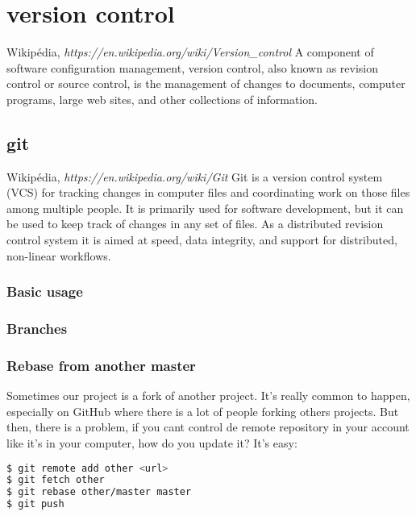 \chapter{version control}
\begin{chapquote}{Wikipédia, \textit{https://en.wikipedia.org/wiki/Version\_control}}
A component of software configuration management, version control, also known as revision control or source control, is the management of changes to documents, computer programs, large web sites, and other collections of information.
\end{chapquote}
\section{git}
\begin{chapquote}{Wikipédia, \textit{https://en.wikipedia.org/wiki/Git}}
Git is a version control system (VCS) for tracking changes in computer files and coordinating work on those files among multiple people. It is primarily used for software development, but it can be used to keep track of changes in any set of files. As a distributed revision control system it is aimed at speed, data integrity, and support for distributed, non-linear workflows.
\end{chapquote}
\subsection{Basic usage}

\subsection{Branches}

\subsection{Rebase from another master}
Sometimes our project is a fork of another project. It's really common to happen, especially on GitHub where there is a lot of people forking others projects.\newline
But then, there is a problem, if you cant control de remote repository in your account like it's in your computer, how do you update it? It's easy:
\begin{lstlisting}[language=Bash]
$ git remote add other <url>
$ git fetch other
$ git rebase other/master master
$ git push
\end{lstlisting}
